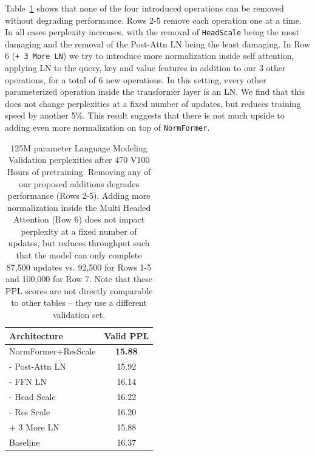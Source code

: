 \documentclass{article} %
\begin{document}
Table~\ref{tab:more_ln} shows that none of the four introduced operations can be removed without degrading performance.
Rows 2-5 remove each operation one at a time. In all cases perplexity increases, with the removal of \texttt{HeadScale} being the most damaging and the removal of the Post-Attn LN being the least damaging.
In Row 6 (\texttt{+ 3 More LN}) we try to introduce more normalization inside self attention, applying LN to the query, key and value features in addition to our 3 other operations, for a total of 6 new operations. In this setting, every other parameterized operation inside the transformer layer is an LN.  We find that this does not change perplexities at a fixed number of updates, but reduces training speed by another 5\%.  This result suggests that there is not much upside to adding even more normalization on top of \texttt{NormFormer}.

\begin{table}[t]
\begin{center}
\begin{tabular}{@{}lc@{}}
\toprule
Architecture   & Valid PPL \\ \midrule
NormFormer+ResScale      & \textbf{15.88}     \\
\hspace{8pt}- Post-Attn LN & 15.92     \\
\hspace{8pt}- FFN LN       & 16.14     \\
\hspace{8pt}- Head Scale   & 16.22     \\ 
\hspace{8pt}- Res Scale    & 16.20     \\ 
\hspace{8pt}+ 3 More LN         & 15.88     \\ \midrule
Baseline       & 16.37     \\ \bottomrule
\end{tabular}
\caption{125M parameter Language Modeling Validation perplexities after 470 V100 Hours of pretraining. Removing any of our proposed additions degrades performance (Rows 2-5). Adding more normalization inside the Multi Headed Attention (Row 6) does not impact perplexity at a fixed number of updates, but reduces throughput such that the model can only complete 87,500 updates vs. 92,500 for Rows 1-5 and 100,000 for Row 7. Note that these PPL scores are not directly comparable to other tables -- they use a different validation set.}
\label{tab:more_ln}
\end{center}
\end{table}
\end{document}
